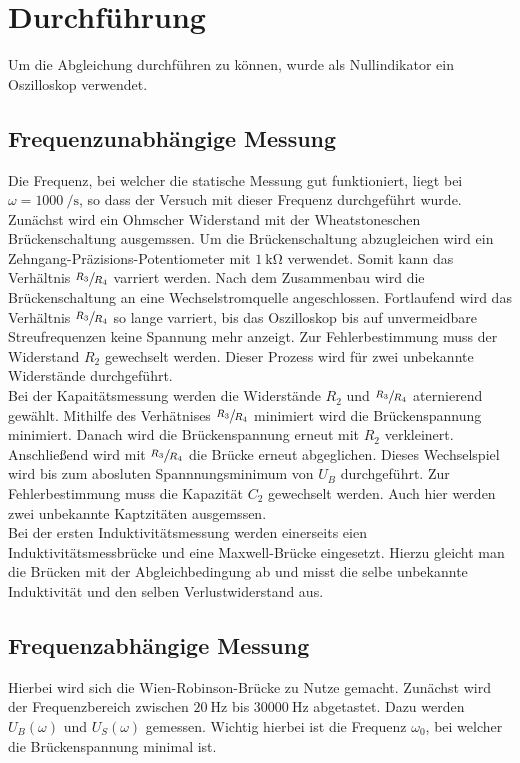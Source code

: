\section{Durchführung}
\label{sec:Durchführung}
Um die Abgleichung durchführen zu können, wurde als Nullindikator ein Oszilloskop verwendet.
\subsection{Frequenzunabhängige Messung}
Die Frequenz, bei welcher die statische Messung gut funktioniert, liegt bei  $ \omega = \SI{1000}{\per\second}$, so dass der Versuch mit dieser Frequenz durchgeführt wurde.\\
Zunächst wird ein Ohmscher Widerstand mit der Wheatstoneschen Brückenschaltung ausgemssen. Um die Brückenschaltung abzugleichen wird ein 
Zehngang-Präzisions-Potentiometer  mit $\SI{1}{\kilo\ohm}$ verwendet. Somit kann das Verhältnis $\sfrac{R_3}{R_4}$ varriert werden.
Nach dem Zusammenbau wird die Brückenschaltung an eine Wechselstromquelle angeschlossen. Fortlaufend wird das Verhältnis 
$\sfrac{R_3}{R_4}$ so lange varriert, bis das Oszilloskop bis auf unvermeidbare 
Streufrequenzen keine Spannung mehr anzeigt. Zur Fehlerbestimmung muss der Widerstand $R_2$ gewechselt werden.
Dieser Prozess wird für zwei unbekannte Widerstände durchgeführt.\\
Bei der Kapaitätsmessung werden die Widerstände $R_2$ und $\sfrac{R_3}{R_4}$ aternierend gewählt. Mithilfe des Verhätnises 
$\sfrac{R_3}{R_4}$ minimiert wird die Brückenspannung minimiert. Danach wird die Brückenspannung erneut mit $R_2$ verkleinert. Anschließend 
wird mit $\sfrac{R_3}{R_4}$ die Brücke erneut abgeglichen. Dieses Wechselspiel wird bis zum abosluten Spannnungsminimum von $U_B$ durchgeführt.
Zur Fehlerbestimmung muss die Kapazität $C_2$ gewechselt werden. Auch hier werden zwei unbekannte Kaptzitäten ausgemssen.\\
Bei der ersten Induktivitätsmessung werden einerseits eien Induktivitätsmessbrücke und eine Maxwell-Brücke eingesetzt. 
Hierzu gleicht man die Brücken mit der Abgleichbedingung ab und misst die selbe unbekannte Induktivität und den selben Verlustwiderstand aus.\\
\subsection{Frequenzabhängige Messung}
Hierbei wird sich die Wien-Robinson-Brücke zu Nutze gemacht. Zunächst wird der Frequenzbereich zwischen $\SI{20}{\hertz}$ bis $\SI{30000}{\hertz}$
abgetastet. Dazu werden $U_B\left(\omega\right)$ und $U_S\left(\omega\right)$ gemessen. Wichtig hierbei ist die Frequenz $\omega_0$, bei welcher die Brückenspannung
minimal ist.